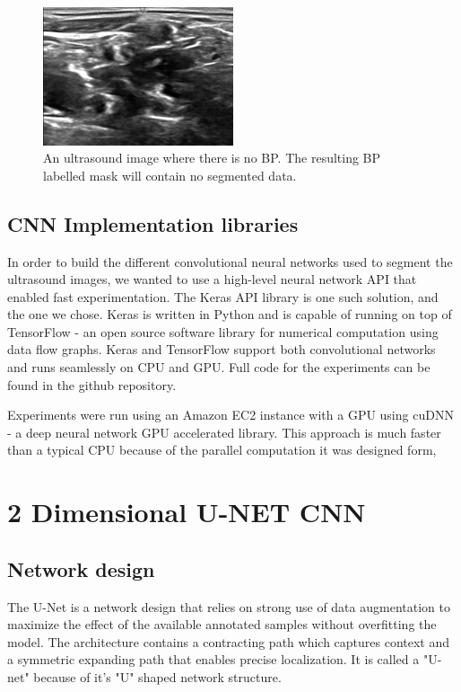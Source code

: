 \documentclass[letterpaper]{article}
\begin{document}
 \begin{figure}[H]
  \centerline{\includegraphics[width=0.5\textwidth]{Images/1_5NoNerve.png}}
  \caption{An ultrasound image where there is no BP. The resulting BP labelled mask will contain no segmented data.}
  \label{fig:BPMask}
\end{figure}

\subsection{CNN Implementation libraries}
In order to build the different convolutional neural networks used to segment the ultrasound images, we wanted to use a high-level neural network API that enabled fast experimentation. The Keras API library is one such solution, and the one we chose. Keras is written in Python and is capable of running on top of TensorFlow - an open source software library for numerical computation using data flow graphs. Keras and TensorFlow support both convolutional networks and runs seamlessly on CPU and GPU. Full code for the experiments can be found in the github repository. \cite{githubrepo}

Experiments were run using an Amazon EC2 instance with a GPU using cuDNN - a deep neural network GPU accelerated library. This approach is much faster than a typical CPU because of the parallel computation it was designed form,

\section{2 Dimensional U-NET CNN}

\subsection{Network design}
The U-Net is a network design that relies on strong use of data augmentation to maximize the effect of the available annotated samples without overfitting the model. The architecture contains a contracting path which captures context and a symmetric expanding path that enables precise localization. It is called a "U-net" because of it's "U" shaped network structure.
\end{document}
